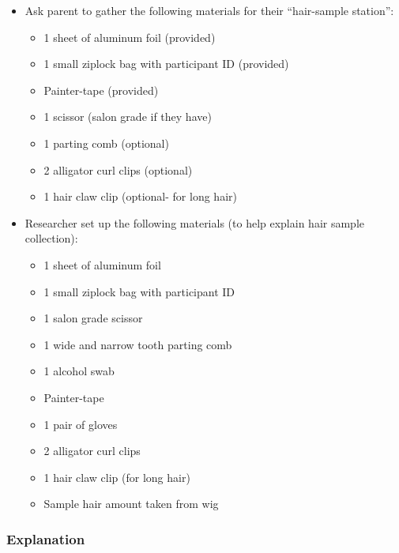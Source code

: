 \documentclass[]{book}
\providecommand{\tightlist}{%
  \setlength{\itemsep}{0pt}\setlength{\parskip}{0pt}}
\begin{document}
\begin{itemize}
\tightlist
\item
  Ask parent to gather the following materials for their ``hair-sample station'':

  \begin{itemize}
  \tightlist
  \item
    1 sheet of aluminum foil (provided)
  \item
    1 small ziplock bag with participant ID (provided)
  \item
    Painter-tape (provided)
  \item
    1 scissor (salon grade if they have)
  \item
    1 parting comb (optional)
  \item
    2 alligator curl clips (optional)
  \item
    1 hair claw clip (optional- for long hair)
  \end{itemize}
\item
  Researcher set up the following materials (to help explain hair sample collection):

  \begin{itemize}
  \tightlist
  \item
    1 sheet of aluminum foil
  \item
    1 small ziplock bag with participant ID
  \item
    1 salon grade scissor
  \item
    1 wide and narrow tooth parting comb
  \item
    1 alcohol swab
  \item
    Painter-tape
  \item
    1 pair of gloves
  \item
    2 alligator curl clips
  \item
    1 hair claw clip (for long hair)
  \item
    Sample hair amount taken from wig
  \end{itemize}
\end{itemize}

\hypertarget{explanation}{%
\subsubsection{Explanation}\label{explanation}}
\end{document}
